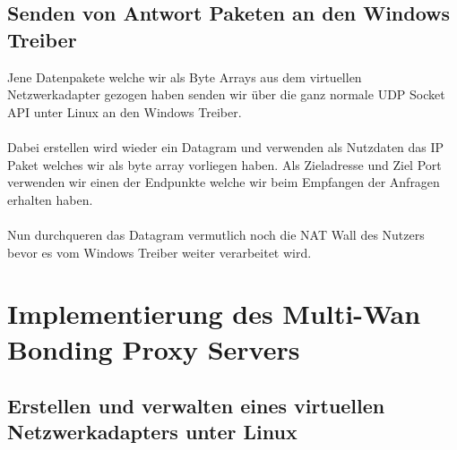 \subsection{Senden von Antwort Paketen an den Windows Treiber}
Jene Datenpakete welche wir als Byte Arrays aus dem virtuellen Netzwerkadapter gezogen haben senden wir über die ganz normale UDP Socket API unter Linux an den Windows Treiber. 
\\\\
Dabei erstellen wird wieder ein Datagram und verwenden als Nutzdaten das IP Paket welches wir als byte array vorliegen haben. Als Zieladresse und Ziel Port verwenden wir einen der Endpunkte welche wir beim Empfangen der Anfragen erhalten haben.
\\\\
Nun durchqueren das Datagram vermutlich noch die NAT Wall des Nutzers bevor es vom Windows Treiber weiter verarbeitet wird. 


\section{Implementierung des Multi-Wan Bonding Proxy Servers}
\subsection{Erstellen und verwalten eines virtuellen Netzwerkadapters unter Linux}
